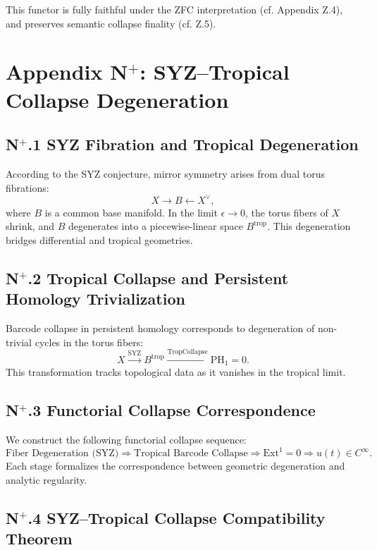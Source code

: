 \documentclass[11pt]{article}
\begin{document}
\begin{axiom}
\begin{axiom}
{{This functor is fully faithful under the ZFC interpretation (cf. Appendix Z.4),  
and preserves semantic collapse finality (cf. Z.5).



\section*{Appendix N$^+$: SYZ–Tropical Collapse Degeneration}

\subsection*{N$^+$.1 SYZ Fibration and Tropical Degeneration}
According to the SYZ conjecture, mirror symmetry arises from dual torus fibrations:
\[
X \to B \leftarrow X^\vee,
\]
where \( B \) is a common base manifold. In the limit \( \epsilon \to 0 \), the torus fibers of \( X \) shrink, and \( B \) degenerates into a piecewise-linear space \( B^{\mathrm{trop}} \). This degeneration bridges differential and tropical geometries.

\subsection*{N$^+$.2 Tropical Collapse and Persistent Homology Trivialization}
Barcode collapse in persistent homology corresponds to degeneration of non-trivial cycles in the torus fibers:
\[
X \xrightarrow{\mathrm{SYZ}} B^{\mathrm{trop}} \xrightarrow{\mathrm{TropCollapse}} \mathrm{PH}_1 = 0.
\]
This transformation tracks topological data as it vanishes in the tropical limit.

\subsection*{N$^+$.3 Functorial Collapse Correspondence}
We construct the following functorial collapse sequence:
\[
\text{Fiber Degeneration (SYZ)} \Rightarrow \text{Tropical Barcode Collapse} \Rightarrow \mathrm{Ext}^1 = 0 \Rightarrow u(t) \in C^\infty.
\]
Each stage formalizes the correspondence between geometric degeneration and analytic regularity.

\subsection*{N$^+$.4 SYZ–Tropical Collapse Compatibility Theorem}

}}
\end{axiom}
\end{axiom}
\end{document}
